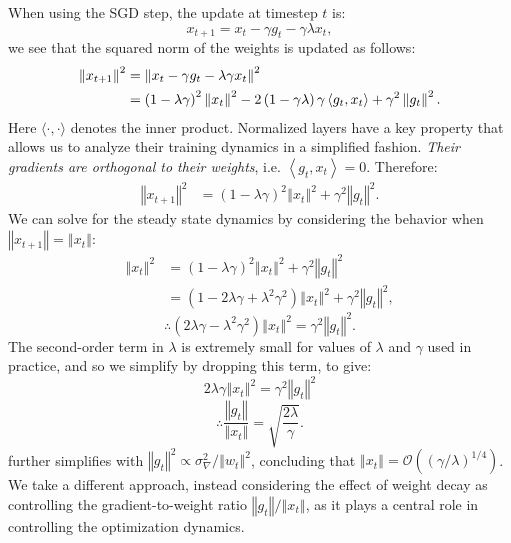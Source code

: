 \documentclass[]{fairmeta}
\begin{document}
When using the SGD step, the update at timestep $t$ is:
\[
    x_{t+1} = x_{t} - \gamma g_{t} - \gamma \lambda x_{t},
\]
we see that the squared norm of the weights is updated as follows:
\begin{align*}
\left\Vert x_{t+1}\right\Vert ^{2} & =\left\Vert x_{t}-\gamma g_{t}-\lambda\gamma x_{t}\right\Vert ^{2} \notag\\
 & =\left(1-\lambda\gamma\right)^{2}\left\Vert x_{t}\right\Vert ^{2}-2\left(1-\gamma\lambda\right)\gamma\left\langle g_{t},x_{t}\right\rangle +\gamma^{2}\left\Vert g_{t}\right\Vert ^{2}.
\end{align*}
Here $\langle\cdot,\cdot\rangle$ denotes the inner product. Normalized layers have a key property that allows us to analyze their training dynamics in a simplified fashion. \emph{Their gradients are orthogonal to their weights}, i.e. $\left\langle g_{t},x_{t}\right\rangle =0$. Therefore:
\begin{align}
\left\Vert x_{t+1}\right\Vert ^{2}
 & =\left(1-\lambda\gamma\right)^{2}\left\Vert x_{t}\right\Vert ^{2}+\gamma^{2}\left\Vert g_{t}\right\Vert ^{2}. \label{eq:basic-update}
\end{align}
We can solve for the steady state dynamics by considering the behavior when $\left\Vert x_{t+1}\right\Vert=\left\Vert x_{t}\right\Vert$:
\begin{align*}
\left\Vert x_{t}\right\Vert ^{2} & =\left(1-\lambda\gamma\right)^{2}\left\Vert x_{t}\right\Vert ^{2}+\gamma^{2}\left\Vert g_{t}\right\Vert ^{2}\\
 & =\left(1-2\lambda\gamma+\lambda^{2}\gamma^{2}\right)\left\Vert x_{t}\right\Vert ^{2}+\gamma^{2}\left\Vert g_{t}\right\Vert ^{2},
\end{align*}
\[
\therefore\left(2\lambda\gamma-\lambda^{2}\gamma^{2}\right)\left\Vert x_{t}\right\Vert ^{2}=\gamma^{2}\left\Vert g_{t}\right\Vert ^{2}.
\]
The second-order term in $\lambda$ is extremely small for values of
$\lambda$ and $\gamma$ used in practice,
and so we simplify by dropping this term, to give:
\[
2\lambda\gamma\left\Vert x_{t}\right\Vert ^{2}=\gamma^{2}\left\Vert g_{t}\right\Vert ^{2}
\]
\[
\therefore\frac{\left\Vert g_{t}\right\Vert }{\left\Vert x_{t}\right\Vert }=\sqrt{\frac{2\lambda}{\gamma}}.
\]
\citet{van2017l2} further simplifies with $\left\Vert g_{t}\right\Vert ^{2} \propto \sigma_{\nabla}^{2}/\left\Vert w_{t}\right\Vert ^{2}$, concluding that $\left\Vert x_{t}\right\Vert =\mathcal{O}\left(\left(\gamma/\lambda\right)^{1/4}\right)$. We take a different approach, instead considering the effect of weight decay as controlling the gradient-to-weight ratio $\left\Vert g_{t}\right\Vert / \left\Vert x_{t}\right\Vert$, as it plays a central role in controlling the optimization dynamics.
\end{document}
